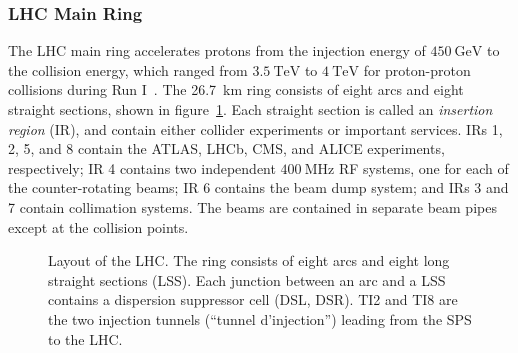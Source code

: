 \subsubsection{LHC Main Ring}
The LHC main ring accelerates protons from the injection energy of $\SI{450}{\giga\electronvolt}$ to the collision energy, which ranged from $\SI{3.5}{\tera\electronvolt}$ to $\SI{4}{\tera\electronvolt}$ for proton-proton collisions during Run I~\cite{Bruning:2004ej}. The \SI{26.7}{\kilo\meter} ring consists of eight arcs and eight straight sections, shown in figure~\ref{fig:LHC-segments}. Each straight section is called an \emph{insertion region} (IR), and contain either collider experiments or important services. IRs 1, 2, 5, and 8 contain the ATLAS, LHCb, CMS, and ALICE experiments, respectively; IR 4 contains two independent $\SI{400}{\mega\hertz}$ RF systems, one for each of the counter-rotating beams; IR 6 contains the beam dump system; and IRs 3 and 7 contain collimation systems. The beams are contained in separate beam pipes except at the collision points.

\begin{figure}[htbp]
	\centering
	\caption{Layout of the LHC. The ring consists of eight arcs and eight long straight sections (LSS). Each junction between an arc and a LSS contains a dispersion suppressor cell (DSL, DSR). TI2 and TI8 are the two injection tunnels (``tunnel d'injection'') leading from the SPS to the LHC.}
	\label{fig:LHC-segments}
\end{figure}


